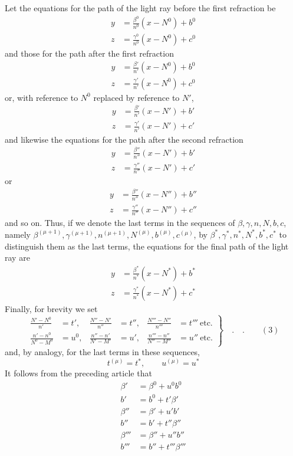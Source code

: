 Let the equations for the path of the light ray before the first refraction be
\[
\begin{aligned}
y&=\frac{\beta^0}{n^0}(x-N^0)+b^0\\
z&=\frac{\gamma^0}{n^0}(x-N^0)+c^0
\end{aligned}
\]
and those for the path after the first refraction
\[
\begin{aligned}
y&=\frac{\beta'}{n'}(x-N^0)+b^0\\
z&=\frac{\gamma'}{n'}(x-N^0)+c^0
\end{aligned}
\]
or, with reference to $N^0$ replaced by reference to $N'$,
\[
\begin{aligned}
y&=\frac{\beta'}{n'}(x-N')+b'\\
z&=\frac{\gamma'}{n'}(x-N')+c'
\end{aligned}
\]
and likewise the equations for the path after the second refraction
\[
\begin{aligned}
y&=\frac{\beta''}{n''}(x-N')+b'\\
z&=\frac{\gamma''}{n''}(x-N')+c'
\end{aligned}
\]
or
\[
\begin{aligned}
y&=\frac{\beta''}{n''}(x-N'')+b''\\
z&=\frac{\gamma''}{n''}(x-N'')+c''
\end{aligned}
\]
and so on. Thus, if we denote the last terms in the sequences of $\beta,\gamma,n,N,b,c$, namely $\beta^{(\mu+1)},\gamma^{(\mu+1)},n^{(\mu+1)},N^{(\mu)},b^{(\mu)},c^{(\mu)}$, by $\beta^*,\gamma^*,n^*,N^*,b^*,c^*$ to distinguish them as the last terms, the equations for the final path of the light ray are
\[
\begin{aligned}
y&=\frac{\beta^*}{n^*}(x-N^*)+b^*\\
z&=\frac{\gamma^*}{n^*}(x-N^*)+c^*
\end{aligned}
\]
Finally, for brevity we set
\[
\left.\begin{aligned}
\frac{N'-N^0}{n'}&=t',&\frac{N''-N'}{n''}&=t'',&\frac{N'''-N''}{n'''}&=t'''\ \text{etc.}\\
\frac{n'-n^0}{N^0-M^0}&=u^0,&\frac{n''-n'}{N'-M'}&=u',&\frac{n'''-n''}{N''-M''}&=u''\ \text{etc.}
\end{aligned}\right\}\quad .\quad .\qquad (3)
\]
and, by analogy, for the last terms in these sequences,
\[
t^{(\mu)}=t^*,\qquad u^{(\mu)}=u^*
\]
It follows from the preceding article that
\[
\begin{aligned}
\beta'&=\beta^0+u^0b^0\\
b'&=b^0+t'\beta'\\
\beta''&=\beta'+u'b'\\
b''&=b'+t''\beta''\\
\beta'''&=\beta''+u''b''\\
b'''&=b''+t'''\beta'''
\end{aligned}
\]
